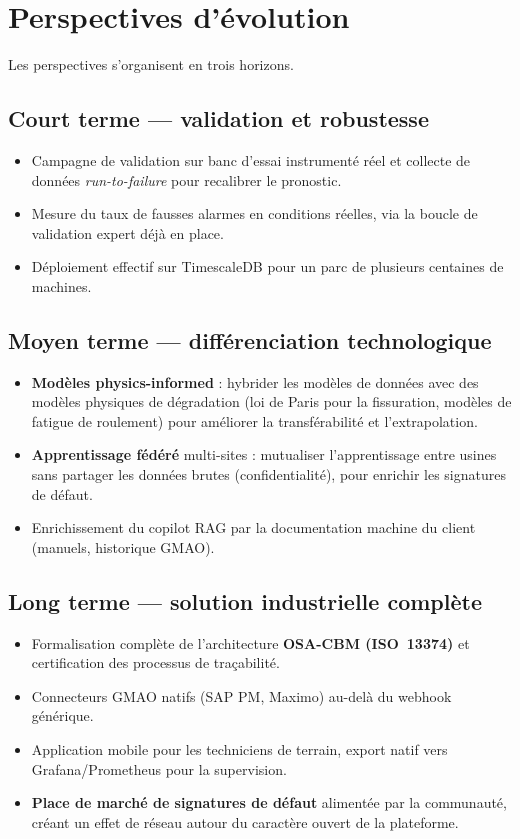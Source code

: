 \section{Perspectives d'évolution}
Les perspectives s'organisent en trois horizons.

\subsection{Court terme --- validation et robustesse}
\begin{itemize}[leftmargin=1.5em]
  \item Campagne de validation sur banc d'essai instrumenté réel et collecte de données
        \emph{run-to-failure} pour recalibrer le pronostic.
  \item Mesure du taux de fausses alarmes en conditions réelles, via la boucle de validation
        expert déjà en place.
  \item Déploiement effectif sur TimescaleDB pour un parc de plusieurs centaines de machines.
\end{itemize}

\subsection{Moyen terme --- différenciation technologique}
\begin{itemize}[leftmargin=1.5em]
  \item \textbf{Modèles physics-informed} : hybrider les modèles de données avec des modèles
        physiques de dégradation (loi de Paris pour la fissuration, modèles de fatigue de
        roulement) pour améliorer la transférabilité et l'extrapolation.
  \item \textbf{Apprentissage fédéré} multi-sites : mutualiser l'apprentissage entre usines
        sans partager les données brutes (confidentialité), pour enrichir les signatures de
        défaut.
  \item Enrichissement du copilot RAG par la documentation machine du client (manuels,
        historique GMAO).
\end{itemize}

\subsection{Long terme --- solution industrielle complète}
\begin{itemize}[leftmargin=1.5em]
  \item Formalisation complète de l'architecture \textbf{OSA-CBM (ISO~13374)} et
        certification des processus de traçabilité.
  \item Connecteurs GMAO natifs (SAP PM, Maximo) au-delà du webhook générique.
  \item Application mobile pour les techniciens de terrain, export natif vers
        Grafana/Prometheus pour la supervision.
  \item \textbf{Place de marché de signatures de défaut} alimentée par la communauté, créant
        un effet de réseau autour du caractère ouvert de la plateforme.
\end{itemize}
